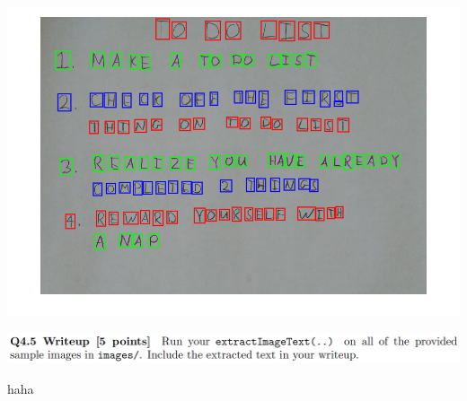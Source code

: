 \documentclass[12pt,letterpaper,boxed]{hmcpset}
\begin{document}
\begin{solution}
\includegraphics[width=\textwidth]{4_3_4.png}\\
\end{solution}
\newpage

\begin{problem}[]
\includegraphics[width=\textwidth]{4_5.png}
\end{problem}

\begin{solution}
haha
\end{solution}
\newpage
\end{document}
